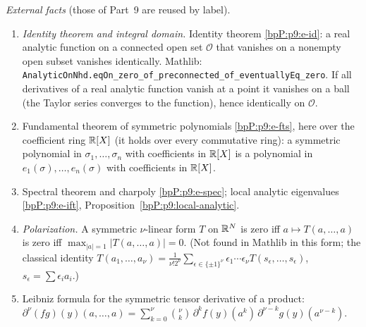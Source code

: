 \emph{External facts} (those of Part~9 are reused by label).
\begin{enumerate}[label=(F\arabic*),ref=(F\arabic*)]
\item\label{bpP:p10:f-id} \emph{Identity theorem and integral domain.} Identity theorem \ref{bpP:p9:e-id}: a real analytic function on a connected open set $\mathcal O$ that vanishes on a nonempty open subset vanishes identically. Mathlib: \texttt{AnalyticOnNhd.eqOn\_zero\_of\_preconnected\_of\_eventuallyEq\_zero}. If all derivatives of a real analytic function vanish at a point it vanishes on a ball (the Taylor series converges to the function), hence identically on $\mathcal O$.
\item\label{bpP:p10:f-fts} Fundamental theorem of symmetric polynomials \ref{bpP:p9:e-fts}, here over the coefficient ring $\mathbb{R}[X]$ (it holds over every commutative ring): a symmetric polynomial in $\sigma_1,\dots,\sigma_n$ with coefficients in $\mathbb{R}[X]$ is a polynomial in $e_1(\sigma),\dots,e_n(\sigma)$ with coefficients in $\mathbb{R}[X]$.
\item\label{bpP:p10:f-spec} Spectral theorem and charpoly \ref{bpP:p9:e-spec}; local analytic eigenvalues \ref{bpP:p9:e-ift}, Proposition~\ref{bpP:p9:local-analytic}.
\item\label{bpP:p10:f-pol} \emph{Polarization.} A symmetric $\nu$-linear form $T$ on $\mathbb{R}^N$ is zero iff $a\mapsto T(a,\dots,a)$ is zero iff $\max_{\lvert a\rvert=1}\lvert T(a,\dots,a)\rvert=0$. (Not found in Mathlib in this form; the classical identity $T(a_1,\dots,a_\nu)=\frac1{\nu!2^\nu}\sum_{\epsilon\in\{\pm1\}^\nu}\epsilon_1\cdots\epsilon_\nu T(s_\epsilon,\dots,s_\epsilon)$, $s_\epsilon=\sum\epsilon_ia_i$.)
\item\label{bpP:p10:f-leib} Leibniz formula for the symmetric tensor derivative of a product: $\partial^\nu(fg)(y)(a,\dots,a)=\sum_{k=0}^\nu\binom\nu k\,\partial^kf(y)(a^k)\,\partial^{\nu-k}g(y)(a^{\nu-k})$.
\end{enumerate}


